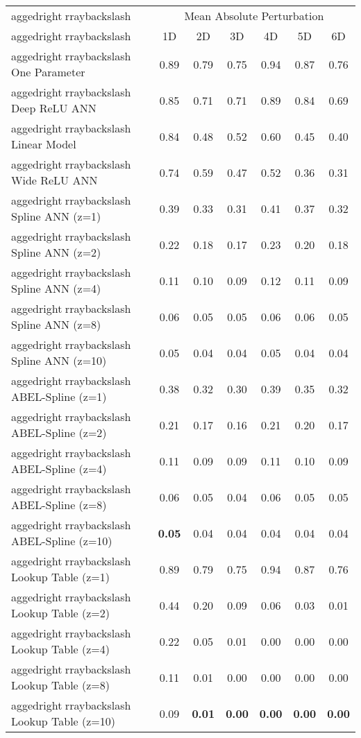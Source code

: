 \begin{table}
\centering
\begin{tabular}{|>{
aggedrightrraybackslash}p{5cm}|c|c|c|c|c|c|}
\hline
\multicolumn{1}{|c|}{Model} & \multicolumn{6}{c|}{Mean Absolute Perturbation} \\ \cline{2-7}
& 1D & 2D & 3D & 4D & 5D & 6D \\ \hline
One Parameter & 0.89 & 0.79 & 0.75 & 0.94 & 0.87 & 0.76 \\ \hline
Deep ReLU ANN & 0.85 & 0.71 & 0.71 & 0.89 & 0.84 & 0.69 \\ \hline
Linear Model & 0.84 & 0.48 & 0.52 & 0.60 & 0.45 & 0.40 \\ \hline
Wide ReLU ANN & 0.74 & 0.59 & 0.47 & 0.52 & 0.36 & 0.31 \\ \hline
Spline ANN (z=1) & 0.39 & 0.33 & 0.31 & 0.41 & 0.37 & 0.32 \\ \hline
Spline ANN (z=2) & 0.22 & 0.18 & 0.17 & 0.23 & 0.20 & 0.18 \\ \hline
Spline ANN (z=4) & 0.11 & 0.10 & 0.09 & 0.12 & 0.11 & 0.09 \\ \hline
Spline ANN (z=8) & 0.06 & 0.05 & 0.05 & 0.06 & 0.06 & 0.05 \\ \hline
Spline ANN (z=10) & 0.05 & 0.04 & 0.04 & 0.05 & 0.04 & 0.04 \\ \hline
ABEL-Spline (z=1) & 0.38 & 0.32 & 0.30 & 0.39 & 0.35 & 0.32 \\ \hline
ABEL-Spline (z=2) & 0.21 & 0.17 & 0.16 & 0.21 & 0.20 & 0.17 \\ \hline
ABEL-Spline (z=4) & 0.11 & 0.09 & 0.09 & 0.11 & 0.10 & 0.09 \\ \hline
ABEL-Spline (z=8) & 0.06 & 0.05 & 0.04 & 0.06 & 0.05 & 0.05 \\ \hline
ABEL-Spline (z=10) & \textbf{0.05} & 0.04 & 0.04 & 0.04 & 0.04 & 0.04 \\ \hline
Lookup Table (z=1) & 0.89 & 0.79 & 0.75 & 0.94 & 0.87 & 0.76 \\ \hline
Lookup Table (z=2) & 0.44 & 0.20 & 0.09 & 0.06 & 0.03 & 0.01 \\ \hline
Lookup Table (z=4) & 0.22 & 0.05 & 0.01 & 0.00 & 0.00 & 0.00 \\ \hline
Lookup Table (z=8) & 0.11 & 0.01 & 0.00 & 0.00 & 0.00 & 0.00 \\ \hline
Lookup Table (z=10) & 0.09 & \textbf{0.01} & \textbf{0.00} & \textbf{0.00} & \textbf{0.00} & \textbf{0.00} \\ \hline
\end{tabular}
\end{table}
